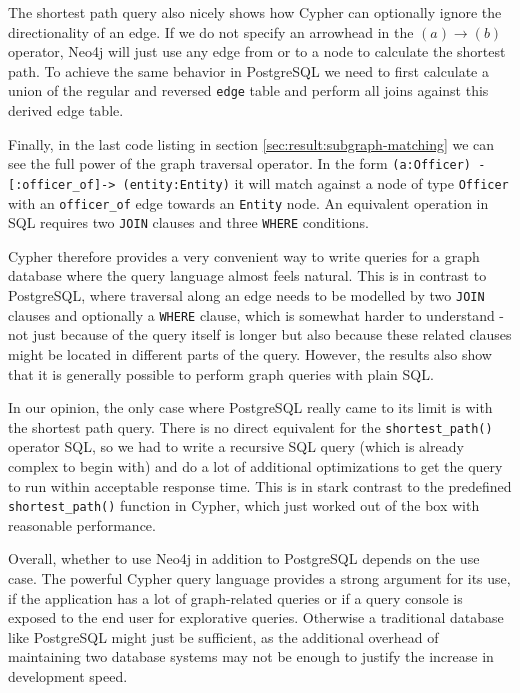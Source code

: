 \documentclass[11pt, a4paper,oneside,chapterprefix=false]{scrbook}
\begin{document}
The shortest path query also nicely shows how Cypher can optionally ignore the directionality of an edge.
If we do not specify an arrowhead in the $(a) \rightarrow (b)$ operator, Neo4j will just use any edge from or to a node to calculate the shortest path.
To achieve the same behavior in PostgreSQL we need to first calculate a union of the regular and reversed \lstinline{edge} table and perform all joins against this derived edge table.

Finally, in the last code listing in section \ref{sec:result:subgraph-matching} we can see the full power of the graph traversal operator. In the form \lstinline{(a:Officer) -[:officer_of]-> (entity:Entity)} it will match against a node of type \lstinline{Officer} with an \lstinline{officer_of} edge towards an \lstinline{Entity} node. An equivalent operation in SQL requires two \lstinline{JOIN} clauses and three \lstinline{WHERE} conditions.

Cypher therefore provides a very convenient way to write queries for a graph database where the query language almost feels natural.
This is in contrast to PostgreSQL, where traversal along an edge needs to be modelled by two \lstinline{JOIN} clauses and optionally a \lstinline{WHERE} clause, which is somewhat harder to understand - not just because of the query itself is longer but also because these related clauses might be located in different parts of the query.
However, the results also show that it is generally possible to perform graph queries with plain SQL.

In our opinion, the only case where PostgreSQL really came to its limit is with the shortest path query.
There is no direct equivalent for the \lstinline{shortest_path()} operator SQL, so we had to write a recursive SQL query (which is already complex to begin with) and do a lot of additional optimizations to get the query to run within acceptable response time.
This is in stark contrast to the predefined \lstinline{shortest_path()} function in Cypher, which just worked out of the box with reasonable performance.

Overall, whether to use Neo4j in addition to PostgreSQL depends on the use case.
The powerful Cypher query language provides a strong argument for its use, if the application has a lot of graph-related  queries or if a query console is exposed to the end user for explorative queries.
Otherwise a traditional database like PostgreSQL might just be sufficient, as the additional overhead of maintaining two database systems may not be enough to justify the increase in development speed.
\end{document}
